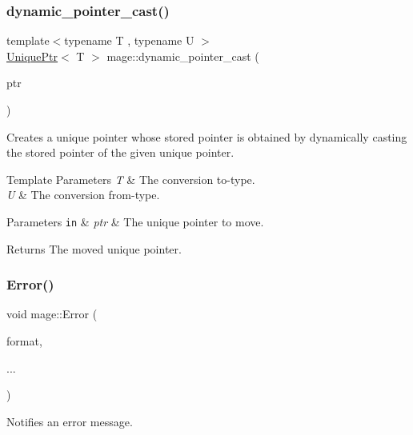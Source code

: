 \subsubsection{\texorpdfstring{dynamic\+\_\+pointer\+\_\+cast()}{dynamic\_pointer\_cast()}}
{\footnotesize\ttfamily template$<$typename T , typename U $>$ \\
\hyperlink{namespacemage_a8c307fbcc33bce9b7f2aa4c26c3b95cf}{Unique\+Ptr}$<$ T $>$ mage\+::dynamic\+\_\+pointer\+\_\+cast (\begin{DoxyParamCaption}\item[{\hyperlink{namespacemage_a8c307fbcc33bce9b7f2aa4c26c3b95cf}{Unique\+Ptr}$<$ U $>$ \&\&}]{ptr }\end{DoxyParamCaption})\hspace{0.3cm}{\ttfamily [noexcept]}}

Creates a unique pointer whose stored pointer is obtained by dynamically casting the stored pointer of the given unique pointer.


\begin{DoxyTemplParams}{Template Parameters}
{\em T} & The conversion to-\/type. \\
\hline
{\em U} & The conversion from-\/type. \\
\hline
\end{DoxyTemplParams}

\begin{DoxyParams}[1]{Parameters}
\mbox{\tt in}  & {\em ptr} & The unique pointer to move. \\
\hline
\end{DoxyParams}
\begin{DoxyReturn}{Returns}
The moved unique pointer. 
\end{DoxyReturn}
\hypertarget{namespacemage_a52a7fe8c9ce39afd9e0b0299373db0fa}{}\label{namespacemage_a52a7fe8c9ce39afd9e0b0299373db0fa} 
\subsubsection{\texorpdfstring{Error()}{Error()}}
{\footnotesize\ttfamily void mage\+::\+Error (\begin{DoxyParamCaption}\item[{const char $\ast$}]{format,  }\item[{}]{... }\end{DoxyParamCaption})}

Notifies an error message.

